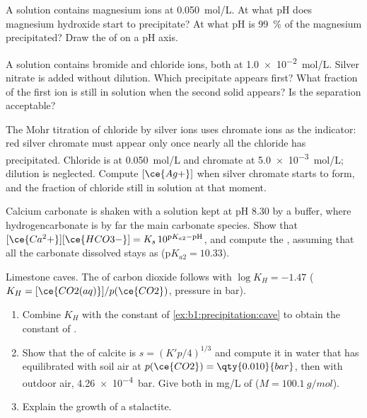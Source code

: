 \begin{exercise}[$\star\star$]\label{exo:b1:precipitation:6}
A solution contains magnesium ions at \qty{0.050}{mol/L}. At what pH does
magnesium hydroxide start to precipitate? At what pH is \qty{99}{\percent} of
the magnesium precipitated? Draw the  of  on a
pH axis.
\end{exercise}

\begin{exercise}[$\star\star$]\label{exo:b1:precipitation:7}
A solution contains bromide and chloride ions, both at
\qty{1.0e-2}{mol/L}. Silver nitrate is added without dilution. Which
precipitate appears first? What fraction of the first ion is still in
solution when the second solid appears? Is the separation acceptable?
\end{exercise}

\begin{exercise}[$\star\star$]\label{exo:b1:precipitation:8}
The Mohr titration of chloride by silver ions uses chromate ions as the
indicator: red silver chromate must appear only once nearly all the
chloride has precipitated. Chloride is at \qty{0.050}{mol/L} and chromate
at \qty{5.0e-3}{mol/L}; dilution is neglected. Compute $[\ce{Ag+}]$ when
silver chromate starts to form, and the fraction of chloride still in
solution at that moment.
\end{exercise}

\begin{exercise}[$\star\star$]\label{exo:b1:precipitation:9}
Calcium carbonate is shaken with a solution kept at pH 8.30 by a buffer,
where hydrogencarbonate is by far the main carbonate species. Show that
$[\ce{Ca^2+}][\ce{HCO3-}] = K_s\,10^{\mathrm{p}K_{a2} - \mathrm{pH}}$, and
compute the , assuming that all the carbonate dissolved stays
as  ($\mathrm{p}K_{a2} = 10.33$).
\end{exercise}

\begin{exercise}[$\star\star\star$]\label{exo:b1:precipitation:10}
Limestone caves. The  of carbon dioxide follows
 with $\log K_H = -1.47$ ($K_H =
[\ce{CO2(aq)}]/p(\ce{CO2})$, pressure in bar).
\begin{enumerate}
  \item Combine $K_H$ with the constant of
        \cref{ex:b1:precipitation:cave} to obtain the constant of
        .
  \item Show that the  of calcite is $s = (K'p/4)^{1/3}$ and
        compute it in water that has equilibrated with soil air at
        $p(\ce{CO2}) = \qty{0.010}{bar}$, then with outdoor air,
        \qty{4.26e-4}{bar}. Give both in \unit{mg/L} of 
        ($M = \qty{100.1}{g/mol}$).
  \item Explain the growth of a stalactite.
\end{enumerate}
\end{exercise}

